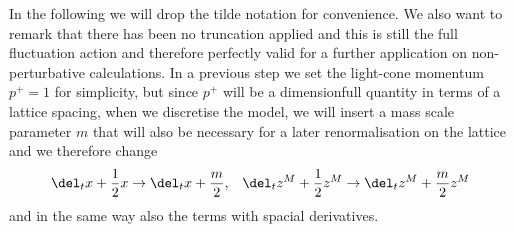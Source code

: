 %
%
In the following we will drop the tilde notation for convenience. We also want to remark that there has been no truncation applied and this is still the full fluctuation action and therefore perfectly valid for a further application on non-perturbative calculations. In a previous step we set the light-cone momentum $p^{+}=1$ for simplicity, but since $p^{+}$ will be a dimensionfull quantity in terms of a lattice spacing, when we discretise the model, we will insert a mass scale parameter $m$ that will also be necessary for a later renormalisation on the lattice and we therefore change
%
%
\begin{align}
\del_{t}x +\frac{1}{2}x &\to \del_{t}x +\frac{m}{2}, & \del_{t}z^{M}+\frac{1}{2}z^{M} \to \del_{t}z^{M}+\frac{m}{2}z^{M}
\end{align}
%
%
and in the same way also the terms with spacial derivatives.
%
%
%
%
%
%
%
%
%
